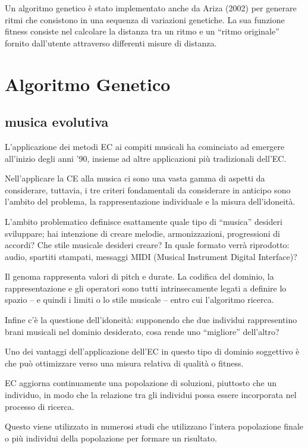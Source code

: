 \documentclass[a4paper,12pt]{report}
\begin{document}
Un algoritmo genetico è stato implementato anche da Ariza (2002) per generare ritmi che consistono in una sequenza di variazioni genetiche.
La sua funzione fitness consiste nel calcolare la distanza tra un ritmo e un “ritmo originale” fornito dall'utente attraverso differenti misure di distanza. 

\section{Algoritmo Genetico}

\subsection{musica evolutiva}

L'applicazione dei metodi EC ai compiti musicali ha cominciato ad emergere all'inizio degli anni '90, insieme ad altre applicazioni più tradizionali dell'EC. 

Nell'applicare la CE alla musica ci sono una vasta gamma di aspetti da considerare, tuttavia, i tre criteri fondamentali da considerare in anticipo sono l'ambito del problema, la rappresentazione individuale e la misura dell'idoneità. 

L’ambito problematico definisce esattamente quale tipo di “musica” desideri sviluppare; hai intenzione di creare melodie, armonizzazioni, progressioni di accordi? 
Che stile musicale desideri creare? 
In quale formato verrà riprodotto: audio, spartiti stampati, messaggi MIDI (Musical Instrument Digital Interface)? 

Il genoma rappresenta valori di pitch e durate. 
La codifica del dominio, la rappresentazione e gli operatori sono tutti intrinsecamente legati a definire lo spazio – e quindi i limiti o lo stile musicale – entro cui l'algoritmo ricerca. 

Infine c’è la questione dell’idoneità: supponendo che due individui rappresentino brani musicali nel dominio desiderato, cosa rende uno “migliore” dell’altro? 

Uno dei vantaggi dell'applicazione dell'EC in questo tipo di dominio soggettivo è che può ottimizzare verso una misura relativa di qualità o fitness. 

EC aggiorna continuamente una popolazione di soluzioni, piuttosto che un individuo, in modo che la relazione tra gli individui possa essere incorporata nel processo di ricerca. 

Questo viene utilizzato in numerosi studi che utilizzano l'intera popolazione finale o più individui della popolazione per formare un risultato. 
\end{document}
